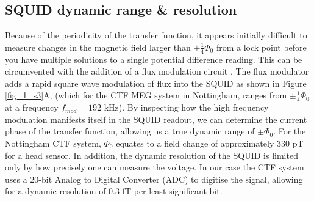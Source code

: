 \subsection{SQUID dynamic range \& resolution}
Because of the periodicity of the transfer function, it appears initially difficult to measure changes in the magnetic field larger than $\pm\frac{1}{4}\Phi_0$ from a lock point before you have multiple solutions to a single potential difference reading. This can be circumvented with the addition of a flux modulation circuit \citep{Forgacs1967}. The flux modulator adds a rapid square wave modulation of flux into the SQUID as shown in Figure \ref{fig_1_s3}A, (which for the CTF MEG system in Nottingham, ranges from $\pm\frac{1}{4}\Phi_0$ at a frequency $f_{mod} = 192$ kHz). By inspecting how the high frequency modulation manifests itself in the SQUID readout, we can determine the current phase of the transfer function, allowing us a true dynamic range of $\pm\Phi_0$. For the Nottingham CTF system, $\Phi_0$ equates to a field change of approximately 330 pT for a head sensor. In addition, the dynamic resolution of the SQUID is limited only by how precisely one can measure the voltage. In our case the CTF system uses a 20-bit Analog to Digital Converter (ADC) to digitise the signal, allowing for a dynamic resolution of 0.3 fT per least significant bit. 

